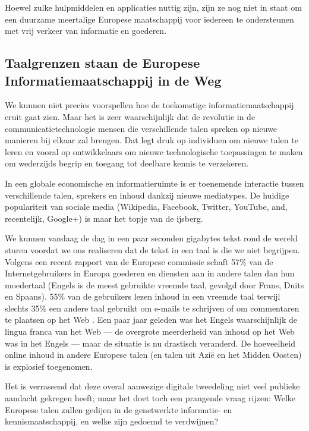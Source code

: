 \begin{multicols}{2}
     Hoewel zulke hulpmiddelen en applicaties nuttig zijn, zijn ze nog niet in staat om een duurzame meertalige Europese maatschappij voor iedereen te ondersteunen met vrij verkeer van informatie en goederen.



\subsection{Taalgrenzen staan de Europese Informatiemaatschappij in de Weg}

    We kunnen niet precies voorspellen hoe de toekomstige informatiemaatschappij eruit gaat zien. Maar het is zeer waarschijnlijk dat de revolutie in de communicatietechnologie mensen die verschillende talen spreken op nieuwe manieren bij elkaar zal brengen. Dat legt druk op individuen om nieuwe talen te leren en vooral op ontwikkelaars om nieuwe technologische toepassingen te maken om wederzijds begrip en toegang tot deelbare kennis te verzekeren.


 In een globale economische en informatieruimte is er toenemende interactie tussen verschillende  talen, sprekers en inhoud dankzij nieuwe mediatypes. De huidige populariteit van sociale media (Wikipedia, Facebook, Twitter, YouTube, and, recentelijk, Google+) is maar het topje van de ijsberg.

    We kunnen vandaag de dag in een paar seconden gigabytes tekst rond de wereld sturen voordat we ons realiseren dat de tekst in een taal is die we niet begrijpen. Volgens een recent rapport van de Europese commissie schaft 57\% van de Internetgebruikers in Europa goederen en diensten aan in andere talen dan hun moedertaal (Engels is de meest gebruikte vreemde taal, gevolgd door Frans, Duits en Spaans). 55\% van de gebruikers lezen inhoud in een vreemde taal terwijl slechts 35\% een andere taal gebruikt om e-mails te schrijven of om commentaren te plaatsen op het Web \cite{EC1}.   Een paar jaar geleden was het Engels waarschijnlijk de lingua franca van het Web --- de overgrote meerderheid van inhoud op het Web was in het Engels --- maar de situatie is nu drastisch veranderd. De hoeveelheid online inhoud in andere Europese talen (en talen uit Azi{\"e} en het Midden Oosten) is explosief toegenomen.

Het is verrassend dat deze overal aanwezige digitale tweedeling niet veel publieke aandacht gekregen heeft; maar het doet toch een prangende vraag rijzen: Welke Europese talen zullen gedijen in de genetwerkte informatie- en kennismaatschappij, en welke zijn gedoemd te verdwijnen?


\end{multicols}
